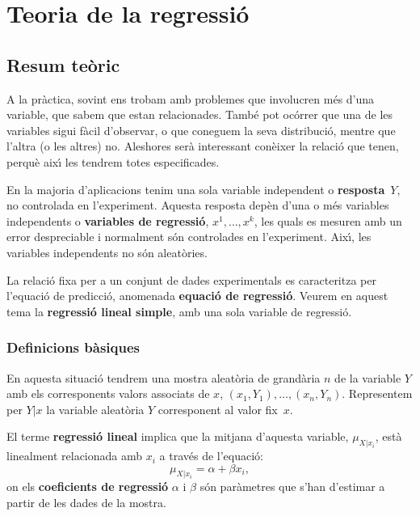 \chapter{Teoria de la regressi\'o}

\section{Resum te\`oric}

A la pr\`actica, sovint ens trobam amb problemes que involucren m\'es 
d'una variable, que sabem que estan relacionades. 
Tamb\'e pot oc\'orrer que una de les variables sigui f\`acil d'observar, 
o que coneguem la seva distribuci\'o, mentre que
l'altra (o les altres) no. Aleshores ser\`a interessant con\`eixer la relaci\'o que tenen,
perqu\`e aix\'{\i} les tendrem totes especificades.

En la majoria d'aplicacions tenim una sola variable independent o 
{\bf resposta}~$Y$, no controlada en l'experiment. 
Aquesta resposta dep\`en d'una o m\'es variables
independents o {\bf variables de regressi\'o},
 $x^1, \ldots , x^k$, 
les quals es mesuren amb un error despreciable i normalment 
s\'on controlades en l'experiment. Aix\'{\i}, les variables independents 
no s\'on aleat\`ories.

La relaci\'o fixa per a un conjunt de dades experimentals es caracteritza per
l'equaci\'o de predicci\'o,
anomenada {\bf equaci\'o de regressi\'o}. Veurem en aquest
tema la {\bf regressi\'o lineal simple}, amb una sola variable de regressi\'o.

\subsection{Definicions b\`asiques}

En aquesta situaci\'o tendrem una mostra aleat\`oria de grand\`aria $n$ de la 
variable $Y$ amb els corresponents valors associats de $x$, 
$(x_1,Y_1), \ldots , (x_n,Y_n)$.
Representem per $Y|x$ la variable aleat\`oria $Y$ corresponent al valor 
fix~$x$.

El terme {\bf regressi\'o lineal} 
implica que la mitjana d'aquesta variable,
$\mu_{X|x_i}$, est\`a linealment relacionada amb $x_i$ a trav\'es de 
l'equaci\'o:
$$\mu_{X|x_i} = \alpha + \beta x_i,$$ on els {\bf coeficients de regressi\'o}
$\alpha$ i $\beta$ s\'on par\`ametres 
que s'han d'estimar a partir de les dades de la
mostra.

